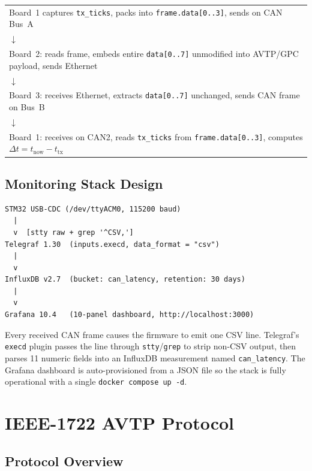 \documentclass[11pt,a4paper]{article}
\begin{document}
\begin{center}
\footnotesize
\begin{tabular}{l}
Board~1 captures \texttt{tx\_ticks}, packs into \texttt{frame.data[0..3]}, sends on CAN Bus~A \\
$\downarrow$ \\
Board~2: reads frame, embeds entire \texttt{data[0..7]} unmodified into AVTP/GPC payload, sends Ethernet \\
$\downarrow$ \\
Board~3: receives Ethernet, extracts \texttt{data[0..7]} unchanged, sends CAN frame on Bus~B \\
$\downarrow$ \\
Board~1: receives on CAN2, reads \texttt{tx\_ticks} from \texttt{frame.data[0..3]},
computes $\Delta t = t_{\text{now}} - t_{\text{tx}}$ \\
\end{tabular}
\end{center}

\subsection{Monitoring Stack Design}

\begin{lstlisting}
STM32 USB-CDC (/dev/ttyACM0, 115200 baud)
  |
  v  [stty raw + grep '^CSV,']
Telegraf 1.30  (inputs.execd, data_format = "csv")
  |
  v
InfluxDB v2.7  (bucket: can_latency, retention: 30 days)
  |
  v
Grafana 10.4   (10-panel dashboard, http://localhost:3000)
\end{lstlisting}

Every received CAN frame causes the firmware to emit one CSV line.  Telegraf's
\texttt{execd} plugin passes the line through \texttt{stty}/\texttt{grep} to strip
non-CSV output, then parses 11 numeric fields into an InfluxDB measurement named
\texttt{can\_latency}.  The Grafana dashboard is auto-provisioned from a JSON file so
the stack is fully operational with a single \texttt{docker compose up -d}.

\section{IEEE-1722 AVTP Protocol}
\label{sec:avtp}

\subsection{Protocol Overview}
\end{document}
